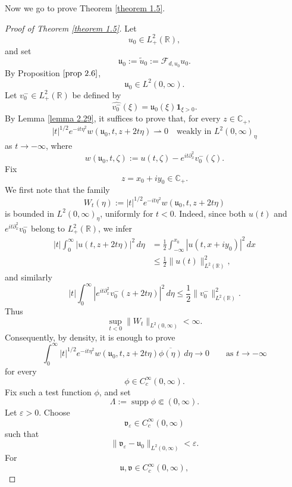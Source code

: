 \documentclass[10pt]{article}
\numberwithin{equation}{section}
\numberwithin{theorem}{section}
\begin{document}
Now we go to prove Theorem \ref{theorem 1.5}.
\begin{proof}[Proof of Theorem \ref{theorem 1.5}]
Let
\[
u_0\in L_+^2(\mathbb R),
\]
and set
\[
\mathfrak u_0:=\widetilde u_0:=\mathcal F_{d,u_0}u_0.
\]
By Proposition \(\ref{prop 2.6}\),
\[
\mathfrak u_0\in L^2(0,\infty).
\]
Let \(v_0^-\in L^2_+(\mathbb R)\) be defined by
\[
\widehat{v_0^-}(\xi)=\mathfrak u_0(\xi)\mathbf 1_{\xi>0}.
\]
By Lemma \ref{lemma 2.29}, it suffices to prove that, for every
\(z\in\mathbb C_+\),
\begin{equation}
\label{eq:thm15-weak-goal}
|t|^{1/2}e^{-it\eta^2}
w(\mathfrak u_0,t,z+2t\eta)
\rightharpoonup0
\quad\text{weakly in }L^2(0,\infty)_\eta
\end{equation}
as \(t\to-\infty\), where
\[
w(\mathfrak u_0,t,\zeta)
:=
u(t,\zeta)-e^{it\partial_x^2}v_0^-(\zeta).
\]
Fix
\[
z=x_0+iy_0\in\mathbb C_+.
\]
We first note that the family
\[
W_t(\eta)
:=
|t|^{1/2}e^{-it\eta^2}
w(\mathfrak u_0,t,z+2t\eta)
\]
is bounded in \(L^2(0,\infty)_\eta\), uniformly for \(t<0\). Indeed, since both
\(u(t)\) and \(e^{it\partial_x^2}v_0^-\) belong to \(L^2_+(\mathbb R)\), we infer
\[
\begin{aligned}
|t|\int_0^\infty
|u(t,z+2t\eta)|^2\,d\eta
&=
\frac12
\int_{-\infty}^{x_0}
|u(t,x+iy_0)|^2\,dx  \\
&\le
\frac12
\|u(t)\|_{L^2(\mathbb R)}^2,
\end{aligned}
\]
and similarly
\[
|t|\int_0^\infty
|e^{it\partial_x^2}v_0^-(z+2t\eta)|^2\,d\eta
\le
\frac12
\|v_0^-\|_{L^2(\mathbb R)}^2.
\]
Thus
\begin{equation}
\label{eq:thm15-uniform-L2-bound}
\sup_{t<0}\|W_t\|_{L^2(0,\infty)}<\infty.
\end{equation}
Consequently, by density, it is enough to prove
\begin{equation}
\label{eq:thm15-test-goal}
\int_0^\infty
|t|^{1/2}e^{-it\eta^2}
w(\mathfrak u_0,t,z+2t\eta)
\overline{\phi(\eta)}\,d\eta
\longrightarrow0 \qquad\text{as }t\to-\infty
\end{equation}
for every
\[
\phi\in C_c^\infty(0,\infty).
\]
Fix such a test function \(\phi\), and set
\[
\Lambda:=\operatorname{supp}\phi\Subset(0,\infty).
\]
Let \(\varepsilon>0\). Choose
\[
\mathfrak v_\varepsilon\in C_c^\infty(0,\infty)
\]
such that
\begin{equation}
\label{eq:thm15-v-eps}
\|\mathfrak v_\varepsilon-\mathfrak u_0\|_{L^2(0,\infty)}<\varepsilon.
\end{equation}
For
\[
\mathfrak u,\mathfrak v\in C_c^\infty(0,\infty),
\]

\end{proof}
\end{document}
